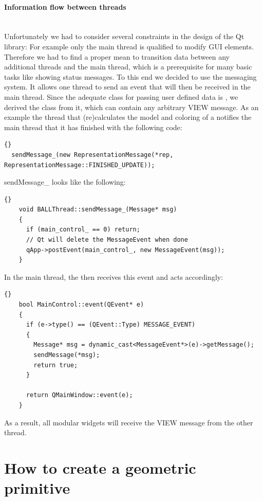 \paragraph{Information flow between threads}
\hspace*{\fill}\\
Unfortunately we had to consider several constraints in the design of the Qt library: For example only the main thread 
is qualified to modify GUI elements. Therefore we had to find a proper mean to transition data between any additional 
threads and the main thread, which is a prerequisite for many basic tasks like showing status messages.
To this end we decided to use the  messaging system. It allows one thread to send an event that will
then be received in the main thread. Since the adequate class for passing user defined data
is , we derived the class  from it, which can contain any arbitrary VIEW message.
As an example the thread that (re)calculates the model and coloring of a  notifies the main thread
that it has finished with the following code:
\begin{lstlisting}{}
  sendMessage_(new RepresentationMessage(*rep, RepresentationMessage::FINISHED_UPDATE));
\end{lstlisting}
sendMessage\_ looks like the following:
\begin{lstlisting}{}
    void BALLThread::sendMessage_(Message* msg)
    {
      if (main_control_ == 0) return;
      // Qt will delete the MessageEvent when done
      qApp->postEvent(main_control_, new MessageEvent(msg));
    }
\end{lstlisting}

In the main thread, the  then receives this event and acts accordingly:
\begin{lstlisting}{}
    bool MainControl::event(QEvent* e)
    {
      if (e->type() == (QEvent::Type) MESSAGE_EVENT)
      {
        Message* msg = dynamic_cast<MessageEvent*>(e)->getMessage();
        sendMessage(*msg);
        return true;
      }

      return QMainWindow::event(e);
    }
\end{lstlisting}

As a result, all modular widgets will receive the VIEW message from the other thread.

\section{How to create a geometric primitive}
\label{section:view_create_a_geometric_primitive}

